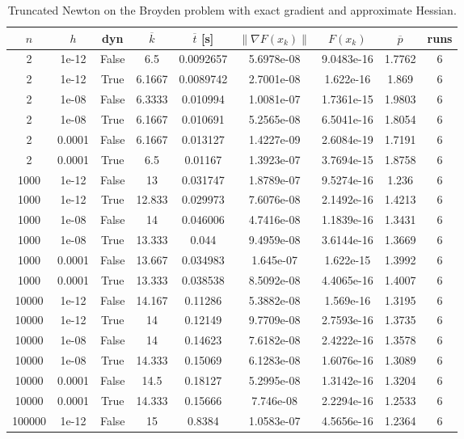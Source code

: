 \begin{table}
\caption{Truncated Newton on the Broyden problem with exact gradient and approximate Hessian.}
\label{tab:tn_broyden_ex_grad}
\begin{tabular}{ccccccccc}
\toprule
$n$ & $h$ & dyn & $\overline{k}$ & $\overline{t}$ [s] & $\|\nabla F(x_k)\|$ & $F(x_k)$ & $\overline{p}$ & runs \\
\midrule
2 & 1e-12 & False & 6.5 & 0.0092657 & 5.6978e-08 & 9.0483e-16 & 1.7762 & 6 \\
2 & 1e-12 & True & 6.1667 & 0.0089742 & 2.7001e-08 & 1.622e-16 & 1.869 & 6 \\
2 & 1e-08 & False & 6.3333 & 0.010994 & 1.0081e-07 & 1.7361e-15 & 1.9803 & 6 \\
2 & 1e-08 & True & 6.1667 & 0.010691 & 5.2565e-08 & 6.5041e-16 & 1.8054 & 6 \\
2 & 0.0001 & False & 6.1667 & 0.013127 & 1.4227e-09 & 2.6084e-19 & 1.7191 & 6 \\
2 & 0.0001 & True & 6.5 & 0.01167 & 1.3923e-07 & 3.7694e-15 & 1.8758 & 6 \\
1000 & 1e-12 & False & 13 & 0.031747 & 1.8789e-07 & 9.5274e-16 & 1.236 & 6 \\
1000 & 1e-12 & True & 12.833 & 0.029973 & 7.6076e-08 & 2.1492e-16 & 1.4213 & 6 \\
1000 & 1e-08 & False & 14 & 0.046006 & 4.7416e-08 & 1.1839e-16 & 1.3431 & 6 \\
1000 & 1e-08 & True & 13.333 & 0.044 & 9.4959e-08 & 3.6144e-16 & 1.3669 & 6 \\
1000 & 0.0001 & False & 13.667 & 0.034983 & 1.645e-07 & 1.622e-15 & 1.3992 & 6 \\
1000 & 0.0001 & True & 13.333 & 0.038538 & 8.5092e-08 & 4.4065e-16 & 1.4007 & 6 \\
10000 & 1e-12 & False & 14.167 & 0.11286 & 5.3882e-08 & 1.569e-16 & 1.3195 & 6 \\
10000 & 1e-12 & True & 14 & 0.12149 & 9.7709e-08 & 2.7593e-16 & 1.3735 & 6 \\
10000 & 1e-08 & False & 14 & 0.14623 & 7.6182e-08 & 2.4222e-16 & 1.3578 & 6 \\
10000 & 1e-08 & True & 14.333 & 0.15069 & 6.1283e-08 & 1.6076e-16 & 1.3089 & 6 \\
10000 & 0.0001 & False & 14.5 & 0.18127 & 5.2995e-08 & 1.3142e-16 & 1.3204 & 6 \\
10000 & 0.0001 & True & 14.333 & 0.15666 & 7.746e-08 & 2.2294e-16 & 1.2533 & 6 \\
100000 & 1e-12 & False & 15 & 0.8384 & 1.0583e-07 & 4.5656e-16 & 1.2364 & 6 \\

\end{tabular}
\end{table}
